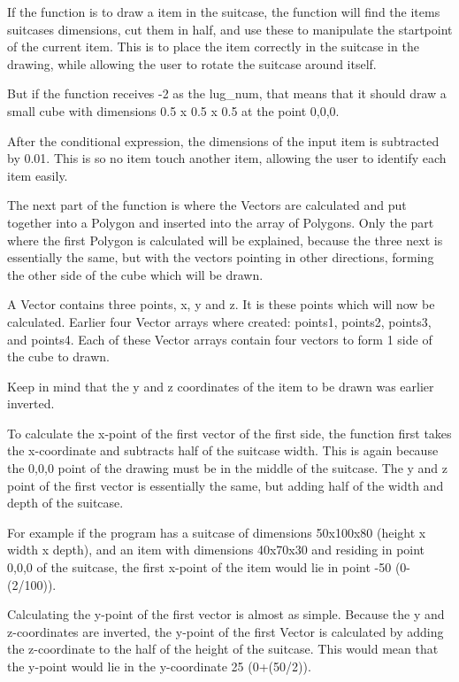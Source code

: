 If the function is to draw a item in the suitcase, the function will find the items suitcases dimensions, cut them in half, and use these to manipulate the startpoint of the current item. This is to place the item correctly in the suitcase in the drawing, while allowing the user to rotate the suitcase around itself. 

But if the function receives -2 as the lug\_num, that means that it should draw a small cube with dimensions 0.5 x 0.5 x 0.5 at the point 0,0,0.

After the conditional expression, the dimensions of the input item is subtracted by 0.01. This is so no item touch another item, allowing the user to identify each item easily. 

The next part of the function is where the Vectors are calculated and put together into a Polygon and inserted into the array of Polygons. Only the part where the first Polygon is calculated will be explained, because the three next is essentially the same, but with the vectors pointing in other directions, forming the other side of the cube which will be drawn.

A Vector contains three points, x, y and z. It is these points which will now be calculated. Earlier four Vector arrays where created: points1, points2, points3, and points4. Each of these Vector arrays contain four vectors to form 1 side of the cube to drawn. 

Keep in mind that the y and z coordinates of the item to be drawn was earlier inverted. 

To calculate the x-point of the first vector of the first side, the function first takes the x-coordinate and subtracts half of the suitcase width. This is again because the 0,0,0 point of the drawing must be in the middle of the suitcase. The y and z point of the first vector is essentially the same, but adding half of the width and depth of the suitcase.


For example if the program has a suitcase of dimensions 50x100x80 (height x width x depth), and an item with dimensions 40x70x30 and residing in point 0,0,0 of the suitcase, the first x-point of the item would lie in point -50 (0-(2/100)). 

Calculating the y-point of the first vector is almost as simple. Because the y and z-coordinates are inverted, the y-point of the first Vector is calculated by adding the z-coordinate to the half of the height of the suitcase. This would mean that the y-point would lie in the y-coordinate 25 (0+(50/2)).

